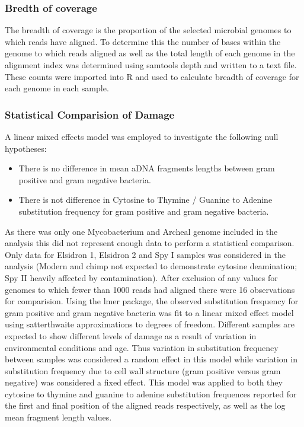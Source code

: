 \documentclass[12pt, a4paper]{article}
\begin{document}
\subsubsection{Bredth of coverage}

The breadth of coverage is the proportion of the selected microbial genomes to which reads have aligned.
To determine this the number of bases within the genome to which reads aligned as well as the total length of each genome in the alignment index was determined using samtools depth and written to a text file. 
These counts were imported into R and used to calculate breadth of coverage for each genome in each sample. 

\subsubsection{Statistical Comparision of Damage}

A linear mixed effects model was employed to investigate the following null hypotheses:

\begin{itemize}
\item There is no difference in mean aDNA fragments lengths between gram positive and gram negative bacteria.
\item There is not difference in Cytosine to Thymine / Guanine to Adenine substitution frequency for gram positive and gram negative bacteria.
\end{itemize}

As there was only one Mycobacterium and Archeal genome included in the analysis this did not represent enough data to perform a statistical comparison.
Only data for Elsidron 1, Elsidron 2 and Spy I samples was considered in the analysis (Modern and chimp not expected to demonstrate cytosine deamination; Spy II heavily affected by contamination). 
After exclusion of any values for genomes to which fewer than 1000 reads had aligned there were 16 observations for comparision. 
Using the lmer package, the observed substitution frequency for gram positive and gram negative bacteria was fit to a linear mixed effect model using satterthwaite approximations to degrees of freedom. 
Different samples are expected to show different levels of damage as a result of variation in environmental conditions and age. 
Thus variation in substitution frequency between samples was considered a random effect in this model while variation in substitution frequency due to cell wall structure (gram positive versus gram negative) was considered a fixed effect.
This model was applied to both they cytosine to thymine and guanine to adenine substitution frequences reported for the first and final position of the aligned reads respectively, as well as the log mean fragment length values.
\end{document}
